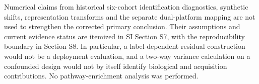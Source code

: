 Numerical claims from historical six-cohort identification diagnostics,
synthetic shifts, representation transforms and the separate dual-platform
mapping are not used to strengthen the corrected primary conclusion.
Their assumptions and current evidence status are itemized in SI Section
S7, with the reproducibility boundary in Section S8. In particular, a
label-dependent residual
construction would not be a deployment evaluation, and a two-way
variance calculation on a confounded design would not by itself
identify biological and acquisition contributions. No pathway-enrichment
analysis was performed.

